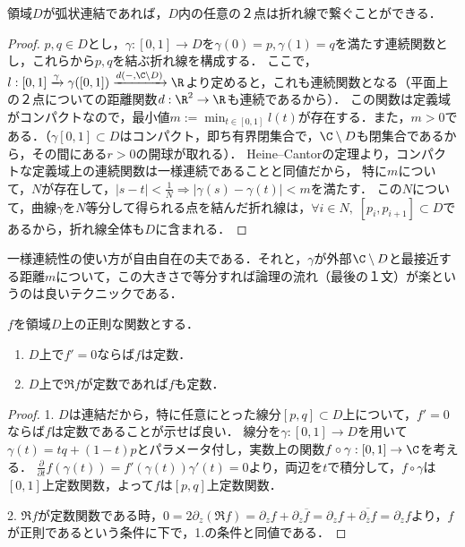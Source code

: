 \documentclass[uplatex, dvipdfmx]{jsreport}
\begin{document}
\begin{proposition}
    領域$D$が弧状連結であれば，$D$内の任意の２点は折れ線で繋ぐことができる．
\end{proposition}
\begin{proof}
    $p,q\in D$とし，$\gamma:[0,1]\to D$を$\gamma(0)=p,\gamma(1)=q$を満たす連続関数とし，これらから$p,q$を結ぶ折れ線を構成する．
    ここで，$l:[0,1]\xrightarrow{\gamma}\gamma([0,1])\xrightarrow{d(-,\C\setminus D)}\R$より定めると，これも連続関数となる（平面上の２点についての距離関数$d:\R^2\to\R$も連続であるから）．
    この関数は定義域がコンパクトなので，最小値$m:=\min_{t\in[0,1]}l(t)$が存在する．また，$m>0$である．（$\gamma[0,1]\subset D$はコンパクト，即ち有界閉集合で，$\C\setminus D$も閉集合であるから，その間にある$r>0$の開球が取れる）．
    Heine–Cantorの定理より，コンパクトな定義域上の連続関数は一様連続であることと同値だから，
    特に$m$について，$N$が存在して，$|s-t|<\frac{1}{N}\Rightarrow|\gamma(s)-\gamma(t)|<m$を満たす．
    この$N$について，曲線$\gamma$を$N$等分して得られる点を結んだ折れ線は，$\forall i\in N,\; [p_i,p_{i+1}]\subset D$であるから，折れ線全体も$D$に含まれる．
\end{proof}
\begin{remark}
    一様連続性の使い方が自由自在の夫である．それと，$\gamma$が外部$\C\setminus D$と最接近する距離$m$について，この大きさで等分すれば論理の流れ（最後の１文）が楽というのは良いテクニックである．
\end{remark}

\begin{theorem}[連結な定義域上の正則関数が定数であるための条件]\label{thm-inquiries-for-regular-functions-to-be-constant}
    $f$を領域$D$上の正則な関数とする．
    \begin{enumerate}
        \item $D$上で$f'=0$ならば$f$は定数．
        \item $D$上で$\Re f$が定数であれば$f$も定数．
    \end{enumerate}
\end{theorem}
\begin{proof}
    1. $D$は連結だから，特に任意にとった線分$[p,q]\subset D$上について，$f'=0$ならば$f$は定数であることが示せば良い．
    線分を$\gamma:[0,1]\to D$を用いて$\gamma(t)=tq+(1-t)p$とパラメータ付し，実数上の関数$f\circ\gamma:[0,1]\to\C$を考える．
    $\frac{\partial}{\partial t}f(\gamma(t))=f'(\gamma(t))\gamma'(t)=0$より，両辺を$t$で積分して，$f\circ\gamma$は$[0,1]$上定数関数，よって$f$は$[p,q]$上定数関数．

    2. $\Re f$が定数関数である時，$0=2\partial_z(\Re f)=\partial_zf+\partial_z\overline{f}=\partial_zf+\overline{\partial_{\overline{z}}f}=\partial_zf$より，$f$が正則であるという条件に下で，1.の条件と同値である．
\end{proof}
\end{document}
